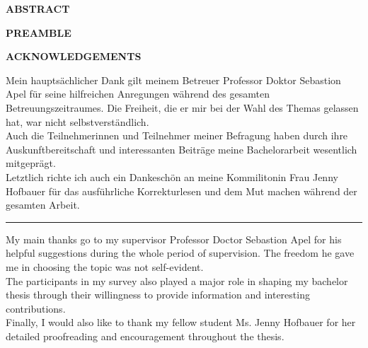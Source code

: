 

{
	\raggedbottom
	\centering
	\vspace{0.9cm}
	\large
	\textbf{ABSTRACT}
	
 	\pagebreak

	\vspace{0.9cm}
	\large
	\textbf{PREAMBLE}
	
	\pagebreak

	\vspace{0.9cm}
	\large
	
	\textbf{\centering ACKNOWLEDGEMENTS}
	\vspace*{\fill}

	Mein hauptsächlicher Dank gilt meinem Betreuer Professor Doktor Sebastion Apel für seine hilfreichen Anregungen während des gesamten Betreuungszeitraumes. Die Freiheit, die er mir bei der Wahl des Themas gelassen hat, war nicht selbstverständlich.
	\newline \\
	Auch die Teilnehmerinnen und Teilnehmer meiner Befragung haben durch ihre Auskunftbereitschaft und interessanten Beiträge meine Bachelorarbeit wesentlich mitgeprägt.
	\newline \\
	Letztlich richte ich auch ein Dankeschön an meine Kommilitonin  Frau Jenny Hofbauer für das ausführliche Korrekturlesen und dem Mut machen während der gesamten Arbeit.
	
	\vspace{1cm}
	\noindent\hfil\rule{0.5\textwidth}{.4pt}\hfil
	\vspace{1cm}
	
	My main thanks go to my supervisor Professor Doctor Sebastion Apel for his helpful suggestions during the whole period of supervision. The freedom he gave me in choosing the topic was not self-evident.
	\newline \\
	The participants in my survey also played a major role in shaping my bachelor thesis through their willingness to provide information and interesting contributions.
	\newline \\
	Finally, I would also like to thank my fellow student Ms. Jenny Hofbauer for her detailed proofreading and encouragement throughout the thesis.
	\vspace*{\fill}
	\pagebreak


\par}